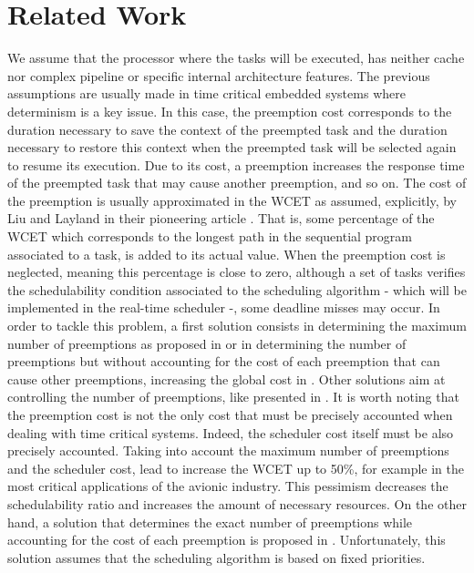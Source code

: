 \documentclass[conference,compsocconf]{IEEEtran}
\begin{document}
\section{Related Work}
\label{relWor}
We assume that the processor where the tasks will be executed, has neither
cache nor complex pipeline or specific internal architecture features. The
previous assumptions are usually made in time critical embedded systems where
determinism is a key issue. In this case, the preemption cost corresponds to
the duration necessary to save the context of the preempted task and the
duration necessary to restore this context when the preempted task will be
selected again to resume its execution. Due to its cost, a preemption increases
the response time of the preempted task that may cause another preemption, and
so on. The cost of the preemption is usually approximated in the WCET as
assumed, explicitly, by Liu and Layland in their pioneering article
\cite{LiuLayland73}. That is, some percentage of the WCET which corresponds to
the longest path in the sequential program associated to a task, is added to
its actual value. When the preemption cost is neglected, meaning this
percentage is close to zero, although a set of tasks verifies the
schedulability condition associated to the scheduling algorithm - which will be
implemented in the real-time scheduler -, some deadline misses may occur. In
order to tackle this problem, a first solution consists in determining the
maximum number of preemptions as proposed in \cite{BurnsTindellWellings95} or
in determining the number of preemptions but without accounting for the cost of
each preemption that can cause other preemptions, increasing the global cost in
\cite{EchagueRipollCrespo95}.  Other solutions aim at controlling the number of
preemptions, like presented in \cite{buttazzoBertogna13}. It is worth noting
that the preemption cost is not the only cost that must be precisely accounted
when dealing with time critical systems. 
Indeed, the scheduler cost itself must be also precisely accounted. Taking into
account the maximum number of preemptions and the scheduler cost, lead to
increase the WCET up to 50\%, for example in the most critical applications of
the avionic industry. This pessimism decreases the schedulability ratio and
increases the amount of necessary resources. On the other hand, a solution that
determines the exact number of preemptions while accounting for the cost of
each preemption is proposed in \cite{ecrts07}.  Unfortunately, this solution
assumes that the scheduling algorithm is based on fixed priorities.
\end{document}
